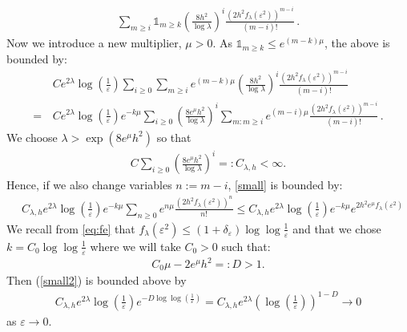 \documentclass[a4paper,reqno,11pt]{amsart}
\makeatletter
\renewenvironment{proof}[1][\proofname]{\par
\pushQED{\qed}%
\normalfont \topsep4\p@\@plus4\p@\relax
\trivlist
\item[\hskip\labelsep
\bfseries
#1\@addpunct{.}]\ignorespaces
}{%
\popQED\endtrivlist\@endpefalse
}
\numberwithin{equation}{section}
\theoremstyle{mytheorem}
\newcommand{\gd}{\delta}
\newcommand{\gl}{\lambda}
\newcommand{\ind}{\mathds{1}}
\renewcommand{\epsilon}{\varepsilon}
\newcommand\ra{\left(}
\newcommand\rb{\right)}
\newcommand{\f}{\frac}
\newcommand{\dlog}{\log\log}
\makeatother
\begin{document}
{\begin{proof}[Proof of Proposition \ref{thm: g upper bound}]
\begin{align*}
        \sum_{m \ge i} \ind_{  m \ge k  }
        \ra \f{8h^2}{\log\gl} \rb^i
        \frac{\ra 2h^2f_\gl(\epsilon^2) \rb^{m-i}}{(m-i)!} \,.
\end{align*}
Now we introduce a new multiplier, $\mu>0$. As $\ind_{m\ge k}\le e^{(m-k)\mu}$, the above is bounded by:
\begin{equation}\label{small}
\begin{split}
    &  C e^{2\gl} \log(\f{1}{\epsilon})
    \sum_{i \ge 0}
    \sum_{m \ge i} 
    e^{(m-k)\mu}
    \ra \f{8 h^2}{\log\gl} \rb^i
    \frac{\ra 
    2 h^2 f_\gl(\epsilon^2)
    \rb^{m-i}
    }{(m-i)!}\\
    = \,&  C e^{2\gl} \log(\f{1}{\epsilon}) e^{-k\mu}
    \sum_{i\ge 0}
    \ra
    \f{8 e^\mu h^2}{\log\gl}
    \rb^i
    \sum_{m: m\ge i}
    e^{(m-i)\mu}
    \f{
    \ra
    2 h^2 f_\gl( \epsilon^2 )
    \rb^{m-i}
    }{(m-i)!} \,.
\end{split}
\end{equation}
We choose $\gl> \exp (8 e^\mu h^2)$ so that 
\begin{align}\label{eq: C_gl,h}
C \sum_{i\ge 0}
    \ra
    \f{8 e^\mu h^2}{\log\gl}
    \rb^i
    =: C_{\gl,h}<\infty.
\end{align}
Hence, if we also change variables $n:=m-i$, \eqref{small} is bounded by:
\begin{equation}\label{small2}
\begin{split}
    & C_{\gl,h} e^{2\gl} \log(\f{1}{\epsilon}) e^{-k\mu}
    \sum_{n\ge 0}
    e^{n\mu}
    \f{
    \ra
    2 h^2 f_\gl( \epsilon^2 )
    \rb^{n}
    }{n!}
    \le C_{\gl,h} e^{2\gl} \log(\f{1}{\epsilon}) e^{-k\mu} e^{ 2h^2e^\mu f_\gl(\epsilon^2) }
\end{split}
\end{equation}
We recall from \eqref{eq:fe} that $f_\gl(\epsilon^2)\leq(1+\gd_\epsilon)\dlog\f{1}{\epsilon}$ and 
that we chose $k=C_0\dlog\f{1}{\epsilon}$ where we will take $C_0>0$ such that:
\begin{align}\label{eq:C0}
C_0\mu - 2 e^\mu h^2 =: D >1.
\end{align}
Then (\ref{small2}) is bounded above by 
\begin{align}\label{eq: final upper bound of m>k}
C_{\gl,h} e^{2\gl} \log(\f{1}{\epsilon}) e^{-D \dlog(\f{1}{\epsilon})} 
= C_{\gl,h} e^{2\gl} \ra \log(\f{1}{\epsilon}) \rb^{1-D}
\rightarrow 0
\end{align}
as $\epsilon\rightarrow 0$.


\end{proof}}
\end{document}
